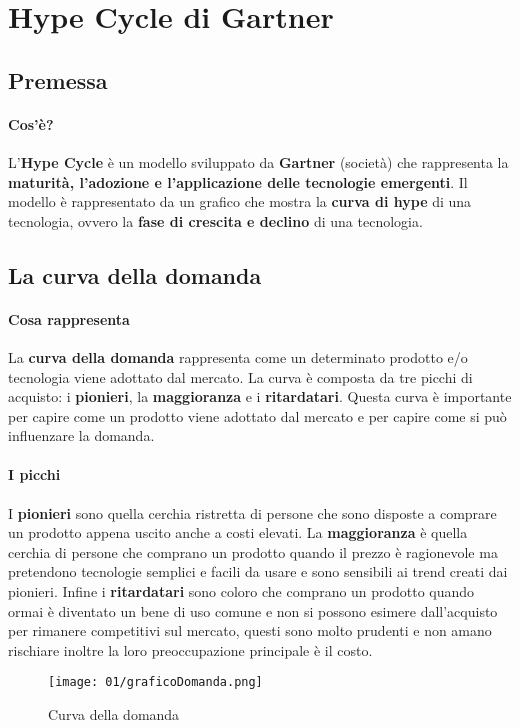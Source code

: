 \section{Hype Cycle di Gartner}
    \subsection{Premessa}
        \paragraph{Cos'è?} L'\textbf{Hype Cycle} è un modello sviluppato da \textbf{Gartner} (società) che rappresenta la \textbf{maturità, l'adozione e l'applicazione delle tecnologie emergenti}. Il modello è rappresentato da un grafico che mostra la \textbf{curva di hype} di una tecnologia, ovvero la \textbf{fase di crescita e declino} di una tecnologia.
    \subsection{La curva della domanda} 
        \paragraph{Cosa rappresenta} La \textbf{curva della domanda} rappresenta come un determinato prodotto e/o tecnologia viene adottato dal mercato. La curva è composta da tre picchi di acquisto: i \textbf{pionieri}, la \textbf{maggioranza} e i \textbf{ritardatari}. Questa curva è importante per capire come un prodotto viene adottato dal mercato e per capire come si può influenzare la domanda.
        \paragraph{I picchi} I \textbf{pionieri} sono quella cerchia ristretta di persone che sono disposte a comprare un prodotto appena uscito anche a costi elevati. La \textbf{maggioranza} è quella cerchia di persone che comprano un prodotto quando il prezzo è ragionevole ma pretendono tecnologie semplici e facili da usare e sono sensibili ai trend creati dai pionieri. Infine i \textbf{ritardatari} sono coloro che comprano un prodotto quando ormai è diventato un bene di uso comune e non si possono esimere dall'acquisto per rimanere competitivi sul mercato, questi sono molto prudenti e non amano rischiare inoltre la loro preoccupazione principale è il costo.
            \begin{figure}[H]
                \centering
                \texttt{[image: 01/graficoDomanda.png]}
                \caption{Curva della domanda}
            \end{figure}
    
